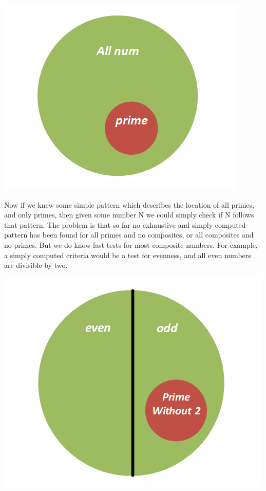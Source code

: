 \documentclass{report}
\begin{document}
\begin{center}
	\includegraphics[scale=1]{72.png}
\end{center}
 Now if we knew some simple pattern which describes the location of all primes, and only primes, then given some number N we could simply check if N follows that pattern. The problem is that so far no exhaustive and simply computed pattern has been found for all primes and no composites, or all composites and no primes. But we do know fast tests for most composite numbers. For example, a simply computed criteria would be a test for evenness, and all even numbers are divisible by two.
 \begin{center}
 	\includegraphics[scale=1]{73.png}
 \end{center}
\end{document}
